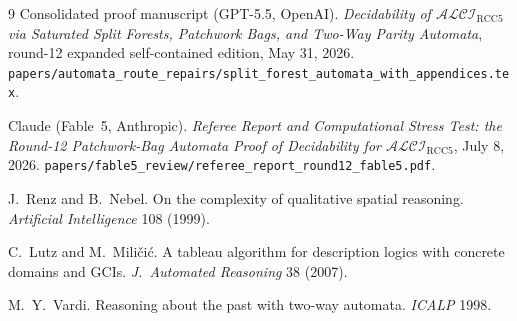 \documentclass[11pt]{article}
\theoremstyle{definition}
\newcommand{\code}[1]{\texttt{#1}}
\begin{document}
\begin{thebibliography}{9}
 Consolidated proof manuscript (GPT-5.5, OpenAI).
\emph{Decidability of $\mathcal{ALCI}_{\mathrm{RCC5}}$ via Saturated
Split Forests, Patchwork Bags, and Two-Way Parity Automata}, round-12
expanded self-contained edition, May 31, 2026.
\code{papers/automata\_route\_repairs/split\_forest\_automata\_with\_appendices.tex}.

 Claude (Fable~5, Anthropic).  \emph{Referee Report
and Computational Stress Test: the Round-12 Patchwork-Bag Automata Proof
of Decidability for $\mathcal{ALCI}_{\mathrm{RCC5}}$}, July 8, 2026.
\code{papers/fable5\_review/referee\_report\_round12\_fable5.pdf}.

 J.~Renz and B.~Nebel.  On the complexity of
qualitative spatial reasoning.  \emph{Artificial Intelligence} 108
(1999).

 C.~Lutz and M.~Mili\v{c}i\'c.  A tableau algorithm
for description logics with concrete domains and GCIs.
\emph{J.~Automated Reasoning} 38 (2007).

 M.~Y.~Vardi.  Reasoning about the past with two-way
automata.  \emph{ICALP} 1998.
\end{thebibliography}
\end{document}
